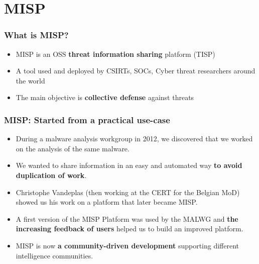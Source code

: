 
\begin{frame}[t,plain]
\titlepage
\end{frame}

\section{MISP}

\begin{frame}
\frametitle{What is MISP?}
\begin{itemize}
       \item MISP is an OSS {\bf threat information sharing} platform (TISP)
       \item A tool used and deployed by CSIRTs, SOCs, Cyber threat researchers around the world
       \item The main objective is {\bf collective defense} against threats
\end{itemize}
\end{frame}

\begin{frame}
 \frametitle{MISP: Started from a practical use-case}
 \begin{itemize}
         \item During a malware analysis workgroup in 2012, we discovered that we worked on the analysis of the same malware.
         \item We wanted to share information in an easy and automated way {\bf to avoid duplication of work}.
         \item Christophe Vandeplas (then working at the CERT for the Belgian MoD) showed us his work on a platform that later became MISP.
         \item A first version of the MISP Platform was used by the MALWG and {\bf the increasing feedback of users} helped us to build an improved platform.
         \item MISP is now {\bf a community-driven development} supporting different intelligence communities.
 \end{itemize}
\end{frame}

